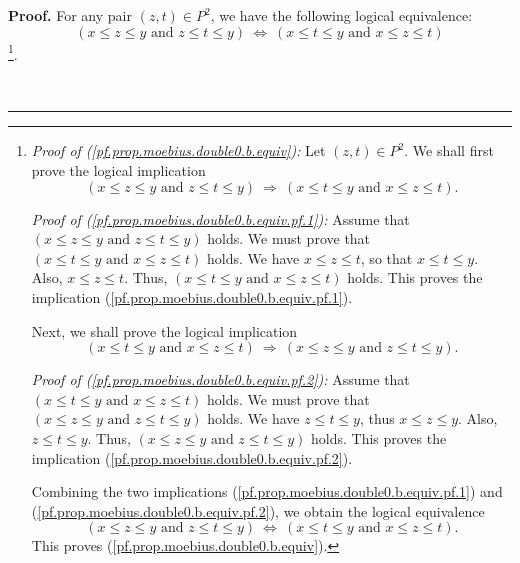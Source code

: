\documentclass[numbers=enddot,12pt,final,onecolumn,notitlepage]{scrartcl}%
\theoremstyle{definition}
\newenvironment{proof}[1][Proof]{\noindent\textbf{#1.} }{\ \rule{0.5em}{0.5em}}
\newenvironment{verlong}{}{}
\begin{document}
\begin{verlong}
\begin{proof}
For any pair $\left(  z,t\right)  \in P^{2}$, we have the following logical
equivalence:%
\begin{equation}
\left(  x\leq z\leq y\text{ and }z\leq t\leq y\right)  \ \Longleftrightarrow
\ \left(  x\leq t\leq y\text{ and }x\leq z\leq t\right)
\label{pf.prop.moebius.double0.b.equiv}%
\end{equation}
\footnote{\textit{Proof of (\ref{pf.prop.moebius.double0.b.equiv}):} Let
$\left(  z,t\right)  \in P^{2}$. We shall first prove the logical implication%
\begin{equation}
\left(  x\leq z\leq y\text{ and }z\leq t\leq y\right)  \ \Longrightarrow
\ \left(  x\leq t\leq y\text{ and }x\leq z\leq t\right)  .
\label{pf.prop.moebius.double0.b.equiv.pf.1}%
\end{equation}
\par
\textit{Proof of (\ref{pf.prop.moebius.double0.b.equiv.pf.1}):} Assume that
$\left(  x\leq z\leq y\text{ and }z\leq t\leq y\right)  $ holds. We must prove
that $\left(  x\leq t\leq y\text{ and }x\leq z\leq t\right)  $ holds. We have
$x\leq z\leq t$, so that $x\leq t\leq y$. Also, $x\leq z\leq t$. Thus,
$\left(  x\leq t\leq y\text{ and }x\leq z\leq t\right)  $ holds. This proves
the implication (\ref{pf.prop.moebius.double0.b.equiv.pf.1}).
\par
Next, we shall prove the logical implication%
\begin{equation}
\left(  x\leq t\leq y\text{ and }x\leq z\leq t\right)  \ \Longrightarrow
\ \left(  x\leq z\leq y\text{ and }z\leq t\leq y\right)  .
\label{pf.prop.moebius.double0.b.equiv.pf.2}%
\end{equation}
\par
\textit{Proof of (\ref{pf.prop.moebius.double0.b.equiv.pf.2}):} Assume that
$\left(  x\leq t\leq y\text{ and }x\leq z\leq t\right)  $ holds. We must prove
that $\left(  x\leq z\leq y\text{ and }z\leq t\leq y\right)  $ holds. We have
$z\leq t\leq y$, thus $x\leq z\leq y$. Also, $z\leq t\leq y$. Thus, $\left(
x\leq z\leq y\text{ and }z\leq t\leq y\right)  $ holds. This proves the
implication (\ref{pf.prop.moebius.double0.b.equiv.pf.2}).
\par
Combining the two implications (\ref{pf.prop.moebius.double0.b.equiv.pf.1})
and (\ref{pf.prop.moebius.double0.b.equiv.pf.2}), we obtain the logical
equivalence%
\[
\left(  x\leq z\leq y\text{ and }z\leq t\leq y\right)  \ \Longleftrightarrow
\ \left(  x\leq t\leq y\text{ and }x\leq z\leq t\right)  .
\]
This proves (\ref{pf.prop.moebius.double0.b.equiv}).}.


\end{proof}
\end{verlong}
\end{document}

